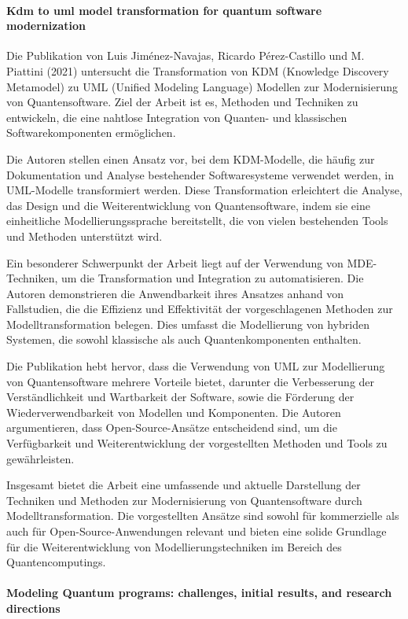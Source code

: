 \paragraph{Kdm to uml model transformation for quantum software modernization}

Die Publikation von Luis Jiménez-Navajas, Ricardo Pérez-Castillo und M. Piattini (2021) untersucht die Transformation 
von KDM (Knowledge Discovery Metamodel) zu UML (Unified Modeling Language) Modellen zur Modernisierung von 
Quantensoftware. Ziel der Arbeit ist es, Methoden und Techniken zu entwickeln, die eine nahtlose Integration 
von Quanten- und klassischen Softwarekomponenten ermöglichen.

Die Autoren stellen einen Ansatz vor, bei dem KDM-Modelle, die häufig zur Dokumentation und Analyse bestehender 
Softwaresysteme verwendet werden, in UML-Modelle transformiert werden. Diese Transformation erleichtert die 
Analyse, das Design und die Weiterentwicklung von Quantensoftware, indem sie eine einheitliche Modellierungssprache 
bereitstellt, die von vielen bestehenden Tools und Methoden unterstützt wird.

Ein besonderer Schwerpunkt der Arbeit liegt auf der Verwendung von MDE-Techniken, um die Transformation und 
Integration zu automatisieren. Die Autoren demonstrieren die Anwendbarkeit ihres Ansatzes anhand von Fallstudien, 
die die Effizienz und Effektivität der vorgeschlagenen Methoden zur Modelltransformation belegen. Dies umfasst 
die Modellierung von hybriden Systemen, die sowohl klassische als auch Quantenkomponenten enthalten.

Die Publikation hebt hervor, dass die Verwendung von UML zur Modellierung von Quantensoftware mehrere Vorteile 
bietet, darunter die Verbesserung der Verständlichkeit und Wartbarkeit der Software, sowie die Förderung der 
Wiederverwendbarkeit von Modellen und Komponenten. Die Autoren argumentieren, dass Open-Source-Ansätze entscheidend 
sind, um die Verfügbarkeit und Weiterentwicklung der vorgestellten Methoden und Tools zu gewährleisten.

Insgesamt bietet die Arbeit eine umfassende und aktuelle Darstellung der Techniken und Methoden zur Modernisierung 
von Quantensoftware durch Modelltransformation. Die vorgestellten Ansätze sind sowohl für kommerzielle als auch 
für Open-Source-Anwendungen relevant und bieten eine solide Grundlage für die Weiterentwicklung von 
Modellierungstechniken im Bereich des Quantencomputings.

\paragraph{Modeling Quantum programs: challenges, initial results, and research directions}

